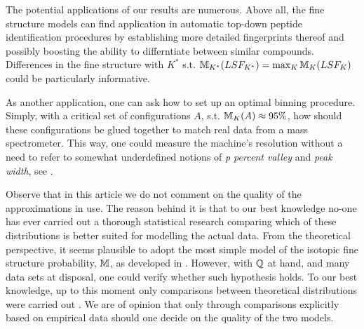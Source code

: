 	The potential applications of our results are numerous. Above all, the fine structure models can find application in automatic top-down peptide identification procedures by establishing more detailed fingerprints thereof and possibly boosting the ability to differntiate between similar compounds. Differences in the fine structure with $K^*$ s.t. $\mathbb{M}_{K^*}(LSF_{K^*}) = \max_K \mathbb{M}_K(LSF_K)$ could be particularly informative.


	As another application, one can ask how to set up an optimal binning procedure. Simply, with a critical set of configurations $A$, s.t. $\mathbb{M}_K(A) \approx 95\%$, how should these configurations be glued together to match real data from a mass spectrometer. This way, one could measure the machine's resolution without a need to refer to somewhat underdefined notions of {\it p percent valley} and {\it peak width}, see \cite{Eidhammer2008ComputationalMethodsInMassSpectrometry}. 


	Observe that in this article we do not comment on the quality of the approximations in use. The reason behind it is that to our best knowledge no-one has ever carried out a thorough statistical research comparing which of these distributions is better suited for modelling the actual data. From the theoretical perspective, it seems plausible to adopt the most simple model of the isotopic fine structure probability, $\mathbb{M}$, as developed in \cite{Kienitz1961MassSpectrometry}. However, with $\mathbb{Q}$ at hand, and many data sets at disposal, one could verify whether such hypothesis holds. To our best knowledge, up to this moment only comparisons between theoretical distributions were carried out \cite{Valkenborg2007UsingPoisson}. We are of opinion that only through comparisons explicitly based on empirical data should one decide on the quality of the two models.






